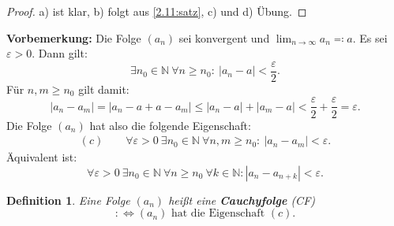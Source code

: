 \documentclass[12pt]{extreport} %
\newcommand{\N}{\mathbb{N}}
\theoremstyle{named}
\theoremstyle{itshape}
\newtheorem*{definition}{Definition}
\theoremstyle{normal}
\begin{document}
\begin{proof}
	a) ist klar, b) folgt aus \ref{2.11:satz}, c) und d) Übung.
\end{proof}


\textbf{Vorbemerkung:} Die Folge $(a_{n})$ sei konvergent und $\lim_{n \rightarrow \infty}  a_{n} \eqqcolon a$. Es sei $\varepsilon > 0$. Dann gilt:
	$$ \exists n_{0} \in \N ~ \forall n \geq n_{0}: ~ |a_{n} - a| < \frac{\varepsilon}{2}.$$
Für $n, m \geq n_{0}$ gilt damit:
	$$ |a_{n} - a_{m}| = |a_{n} - a + a - a_{m} | \leq |a_{n} - a| + |a_{m} - a| < \frac{\varepsilon}{2} + \frac{\varepsilon}{2} = \varepsilon. $$
Die Folge $(a_{n})$ hat also die folgende Eigenschaft:
	\begin{align*}
	(c) \quad \quad	\forall \varepsilon > 0 ~  \exists n_{0} \in \N ~ \forall n,m \geq n_{0}: ~ |a_{n} - a_{m}| < \varepsilon.
	\end{align*}
Äquivalent ist:	
$$\forall \varepsilon > 0 ~\exists n_{0} \in \N ~ \forall n \ge n_0 ~ \forall k \in \N: |a_{n} - a_{n+k}| < \varepsilon.$$

\begin{definition} 
	Eine Folge $(a_{n})$ hei{\ss}t eine \textbf{Cauchyfolge} (CF)
	$$ :\iff (a_{n}) \text{ hat die Eigenschaft } (c). $$	
\end{definition}




\appendix 

\renewcommand{\indexname}{Stichwortverzeichnis}
\printindex
\end{document}
